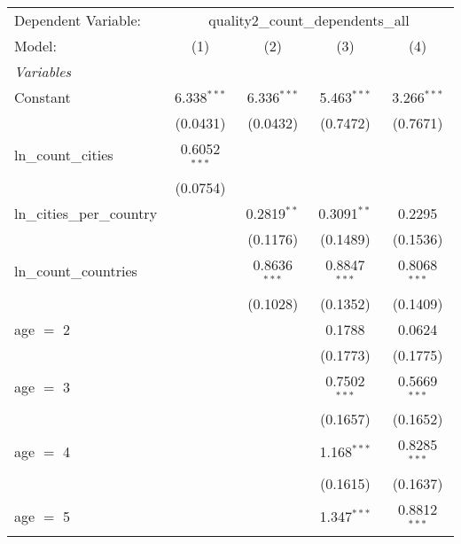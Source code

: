 
\begingroup
\centering
\begin{tabular}{lcccc}
   \tabularnewline \midrule \midrule
   Dependent Variable: & \multicolumn{4}{c}{quality2\_count\_dependents\_all}\\
   Model:                               & (1)            & (2)            & (3)            & (4)\\  
   \midrule
   \emph{Variables}\\
   Constant                             & 6.338$^{***}$  & 6.336$^{***}$  & 5.463$^{***}$  & 3.266$^{***}$\\   
                                        & (0.0431)       & (0.0432)       & (0.7472)       & (0.7671)\\   
   ln\_count\_cities                    & 0.6052$^{***}$ &                &                &   \\   
                                        & (0.0754)       &                &                &   \\   
   ln\_cities\_per\_country             &                & 0.2819$^{**}$  & 0.3091$^{**}$  & 0.2295\\   
                                        &                & (0.1176)       & (0.1489)       & (0.1536)\\   
   ln\_count\_countries                 &                & 0.8636$^{***}$ & 0.8847$^{***}$ & 0.8068$^{***}$\\   
                                        &                & (0.1028)       & (0.1352)       & (0.1409)\\   
   age $=$ 2                            &                &                & 0.1788         & 0.0624\\   
                                        &                &                & (0.1773)       & (0.1775)\\   
   age $=$ 3                            &                &                & 0.7502$^{***}$ & 0.5669$^{***}$\\   
                                        &                &                & (0.1657)       & (0.1652)\\   
   age $=$ 4                            &                &                & 1.168$^{***}$  & 0.8285$^{***}$\\   
                                        &                &                & (0.1615)       & (0.1637)\\   
   age $=$ 5                            &                &                & 1.347$^{***}$  & 0.8812$^{***}$\\   

\end{tabular}
